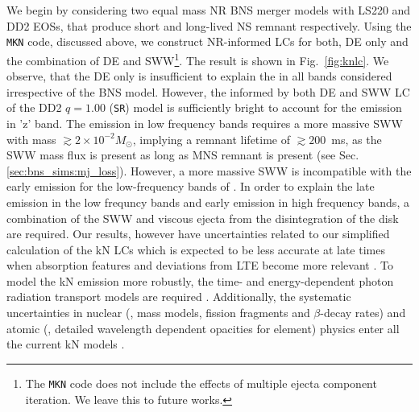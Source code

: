 We begin by considering two equal mass \ac{NR} \ac{BNS} merger models with LS220 
and DD2 \acp{EOS}, that produce short and long-lived \ac{NS} remnant respectively. 
Using the \texttt{MKN} code, discussed above, we construct \ac{NR}-informed 
\acp{LC} for both, \ac{DE} only and the combination of \ac{DE} and \ac{SWW}\footnote{
    The \texttt{MKN} code does not include the effects of multiple ejecta component 
    iteration. We leave this to future works.
}.
The result is shown in Fig.~\ref{fig:knlc}.
We observe, that the \ac{DE} only is insufficient to explain the \AT{} in 
all bands considered irrespective of the \ac{BNS} model. However, the informed 
by both \ac{DE} and \ac{SWW} \ac{LC} of the DD2 $q=1.00$ (\texttt{SR}) model 
is sufficiently bright to account for the emission in 'z' band. 
The emission in low frequency bands requires a more massive 
\ac{SWW} with mass ${\gtrsim} 2\times10^{-2}M_{\odot}$, implying a remnant lifetime of ${\gtrsim}200$~ms, as the \ac{SWW} mass flux is present as long 
as \ac{MNS} remnant is present (see Sec.\ref{sec:bns_sims:mj_loss}).
However, a more massive \ac{SWW} is incompatible with
the early emission for the low-frequency bands of \AT{}.
In order to explain the late emission in the low frequncy bands and 
early emission in high frequency bands, a combination of the \ac{SWW} and 
viscous ejecta from the disintegration of the disk are required.
Our results, however have uncertainties related to our simplified calculation of
the \ac{kN} \acp{LC} which is expected to be less accurate at
late times when absorption features and deviations from \ac{LTE} become more relevant \citep[see \eg][]{Smartt:2017fuw}.
To model the \ac{kN} emission more robustly, the time- and energy-dependent 
photon radiation transport models are required 
\citep{Kasen:2017sxr,Tanaka:2017qxj,Miller:2019dpt,Bulla:2019muo}.
Additionally, the systematic uncertainties in
nuclear (\eg, mass models, fission fragments and $\beta$-decay
rates) and atomic (\eg, detailed wavelength dependent opacities for
\rproc{} element) physics enter all the current \ac{kN} models 
\citep{Eichler:2014kma,Rosswog:2016dhy,Gaigalas:2019ptx}.




